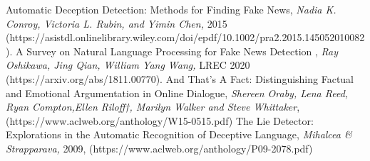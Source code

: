 \documentclass[14pt]{extarticle}
\begin{document}
\begin{thebibliography}{99}
Automatic Deception Detection: Methods for Finding Fake News, \emph{Nadia K. Conroy, Victoria L. Rubin, and Yimin Chen,} 2015 (https://asistdl.onlinelibrary.wiley.com/doi/epdf/10.1002/pra2.2015.145052010082).
A Survey on Natural Language Processing for Fake News Detection , \emph{Ray Oshikawa, Jing Qian, William Yang Wang,} LREC 2020 (https://arxiv.org/abs/1811.00770).
And That's A Fact: Distinguishing Factual and Emotional Argumentation in Online Dialogue, \emph{ Shereen Oraby, Lena Reed, Ryan Compton,Ellen Riloff†, Marilyn Walker and Steve Whittaker}, (https://www.aclweb.org/anthology/W15-0515.pdf)
The Lie Detector: Explorations in the Automatic Recognition of Deceptive Language, \emph{Mihalcea \& Strapparava,} 2009, (https://www.aclweb.org/anthology/P09-2078.pdf)
\end{thebibliography}
\end{document}
